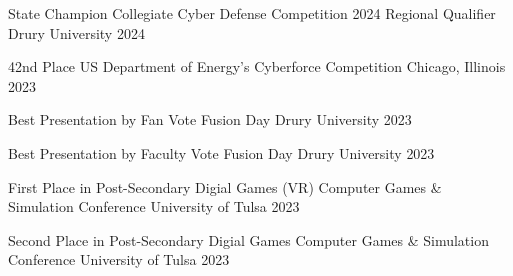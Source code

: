 



\begin{cvhonors}


  \cvhonor
    {State Champion} %
    {Collegiate Cyber Defense Competition 2024 Regional Qualifier} %
    {Drury University} %
    {2024} %


  \cvhonor
    {42nd Place} %
    {US Department of Energy's Cyberforce Competition} %
    {Chicago, Illinois} %
    {2023} %
  

    \cvhonor
    {Best Presentation by Fan Vote} %
    {Fusion Day} %
    {Drury University} %
    {2023} %

  
    \cvhonor
    {Best Presentation by Faculty Vote} %
    {Fusion Day} %
    {Drury University} %
    {2023} %


    \cvhonor
    {First Place in Post-Secondary Digial Games (VR)} %
    {Computer Games \& Simulation Conference} %
    {University of Tulsa} %
    {2023} %


    \cvhonor
    {Second Place in Post-Secondary Digial Games} %
    {Computer Games \& Simulation Conference} %
    {University of Tulsa} %
    {2023} %


\end{cvhonors}
